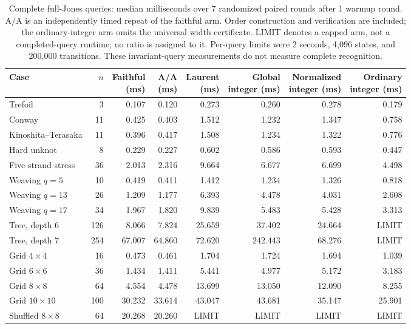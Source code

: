 \begin{table}[H]
\centering\footnotesize
\setlength{\tabcolsep}{3pt}
\renewcommand{\arraystretch}{1.12}
\begin{tabular*}{\linewidth}{@{\extracolsep{\fill}}lrrrrrrr@{}}
\toprule
Case & $n$ & \shortstack{Faithful\\(ms)} & \shortstack{A/A\\(ms)} & \shortstack{Laurent\\(ms)} & \shortstack{Global\\integer (ms)} & \shortstack{Normalized\\integer (ms)} & \shortstack{Ordinary\\integer (ms)}\\
\midrule
Trefoil & 3 & 0.107 & 0.120 & 0.273 & 0.260 & 0.278 & 0.179\\
Conway & 11 & 0.425 & 0.403 & 1.512 & 1.232 & 1.347 & 0.758\\
Kinoshita--Terasaka & 11 & 0.396 & 0.417 & 1.508 & 1.234 & 1.322 & 0.776\\
Hard unknot & 8 & 0.229 & 0.227 & 0.602 & 0.586 & 0.593 & 0.447\\
Five-strand stress & 36 & 2.013 & 2.316 & 9.664 & 6.677 & 6.699 & 4.498\\
Weaving $q=5$ & 10 & 0.419 & 0.411 & 1.412 & 1.234 & 1.326 & 0.818\\
Weaving $q=13$ & 26 & 1.209 & 1.177 & 6.393 & 4.478 & 4.031 & 2.608\\
Weaving $q=17$ & 34 & 1.967 & 1.820 & 9.839 & 5.483 & 5.428 & 3.313\\
Tree, depth 6 & 126 & 8.066 & 7.824 & 25.659 & 37.402 & 24.664 & \textsf{LIMIT}\\
Tree, depth 7 & 254 & 67.007 & 64.860 & 72.620 & 242.443 & 68.276 & \textsf{LIMIT}\\
Grid $4\times4$ & 16 & 0.473 & 0.461 & 1.704 & 1.724 & 1.694 & 1.039\\
Grid $6\times6$ & 36 & 1.434 & 1.411 & 5.441 & 4.977 & 5.172 & 3.183\\
Grid $8\times8$ & 64 & 4.554 & 4.478 & 13.699 & 13.050 & 12.090 & 8.255\\
Grid $10\times10$ & 100 & 30.232 & 33.614 & 43.047 & 43.681 & 35.147 & 25.901\\
Shuffled $8\times8$ & 64 & 20.268 & 20.260 & \textsf{LIMIT} & \textsf{LIMIT} & \textsf{LIMIT} & \textsf{LIMIT}\\
\bottomrule
\end{tabular*}
\caption{Complete full-Jones queries: median milliseconds over 7 randomized paired rounds after 1 warmup round. A/A is an independently timed repeat of the faithful arm. Order construction and verification are included; the ordinary-integer arm omits the universal width certificate. \textsf{LIMIT} denotes a capped arm, not a completed-query runtime; no ratio is assigned to it. Per-query limits were 2 seconds, 4,096 states, and 200,000 transitions. These invariant-query measurements do not measure complete recognition.}
\label{tab:tensor-times}
\end{table}
